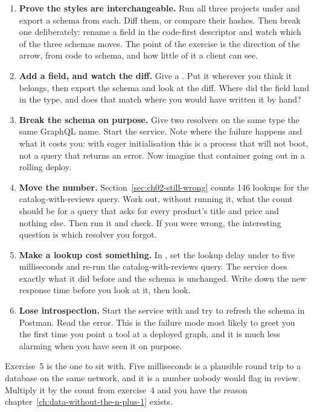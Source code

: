 \begin{enumerate}
  \item \textbf{Prove the styles are interchangeable.} Run all three projects
  under  and export a schema from each. Diff
  them, or compare their hashes. Then break one deliberately: rename a field in
  the code-first descriptor and watch which of the three schemas moves. The
  point of the exercise is the direction of the arrow, from code to schema, and
  how little of it a client can see.

  \item \textbf{Add a field, and watch the diff.} Give  a
  . Put it wherever you think it belongs, then export the
  schema and look at the diff. Where did the field land in the type, and does
  that match where you would have written it by hand?

  \item \textbf{Break the schema on purpose.} Give two resolvers on the same
  type the same GraphQL name. Start the service. Note where the failure happens
  and what it costs you: with eager initialisation this is a process that will
  not boot, not a query that returns an error. Now imagine that container going
  out in a rolling deploy.

  \item \textbf{Move the number.} Section~\ref{sec:ch02-still-wrong} counts 146
  lookups for the catalog-with-reviews query. Work out, without running it, what
  the count should be for a query that asks for every product's title and price
  and nothing else. Then run it and check. If you were wrong, the interesting
  question is which resolver you forgot.

  \item \textbf{Make a lookup cost something.} In , set
  the lookup delay under  to five milliseconds and re-run the
  catalog-with-reviews query. The service does exactly what it did before and
  the schema is unchanged. Write down the new response time before you look at
  it, then look.

  \item \textbf{Lose introspection.} Start the service with
   and try to refresh the schema in
  Postman. Read the error. This is the failure mode most likely to greet you the
  first time you point a tool at a deployed graph, and it is much less alarming
  when you have seen it on purpose.
\end{enumerate}

Exercise~5 is the one to sit with. Five milliseconds is a plausible round trip
to a database on the same network, and it is a number nobody would flag in
review. Multiply it by the count from exercise~4 and you have the reason
chapter~\ref{ch:data-without-the-n-plus-1} exists.
